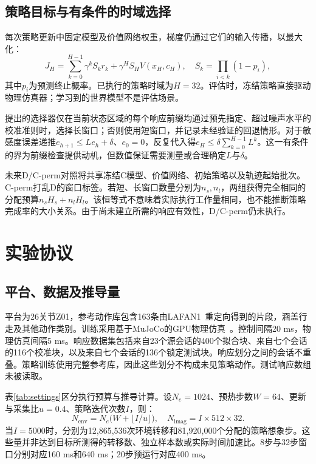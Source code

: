\subsection{策略目标与有条件的时域选择}
每次策略更新中固定模型及价值网络权重，梯度仍通过它们的输入传播，以最大化：
\begin{equation}
J_H=\sum_{k=0}^{H-1}\gamma^k S_k r_k
+\gamma^H S_H V(x_H,c_H),\quad
S_k=\prod_{i<k}(1-p_i),
\label{eq:actor}
\end{equation}
其中$p_i$为预测终止概率。已执行的策略时域为$H=32$。评估时，冻结策略直接驱动物理仿真器；学习到的世界模型不是评估场景。

提出的选择器仅在当前状态区域的每个响应前缀均通过预先指定、超过噪声水平的校准准则时，选择长窗口；否则使用短窗口，并记录未经验证的回退情形。对于敏感度误差递推$e_{h+1}\le Le_h+\delta$、$e_0=0$，反复代入得$e_H\le\delta\sum_{k=0}^{H-1}L^k$。这一有条件的界为前缀检查提供动机，但数值保证需要测量或合理确定$L$与$\delta$。

未来D/C-perm对照将共享冻结C模型、价值网络、初始策略以及轨迹起始批次。C-perm打乱D的窗口标签。若短、长窗口数量分别为$n_s,n_l$，两组获得完全相同的分配预算$n_sH_s+n_lH_l$。该恒等式不意味着实际执行工作量相同，也不能推断策略完成率的大小关系。由于尚未建立所需的响应有效性，D/C-perm仍未执行。

\section{实验协议}
\subsection{平台、数据及推导量}
平台为26关节Z01，参考动作库包含163条由LAFAN1~\cite{lafan}重定向得到的片段，涵盖行走及其他动作类别。训练采用基于MuJoCo的GPU物理仿真~\cite{mujoco}。控制间隔20 ms，物理仿真间隔5 ms。响应数据集包括来自23个源会话的400个拟合块、来自七个会话的116个校准块，以及来自七个会话的136个锁定测试块。响应划分之间的会话不重叠。策略训练使用完整参考库，因此这些划分不构成未见策略动作。测试响应数组未被读取。

表\ref{tab:settings}区分执行预算与推导计算。设$N_e=1024$、预热步数$W=64$、更新与采集比$u=0.4$、策略迭代次数$I$，则：
\begin{equation}
N_{\mathrm{env}}=N_e\bigl(W+\lfloor I/u\rfloor\bigr),\quad
N_{\mathrm{imag}}=I\times512\times32.
\label{eq:budget}
\end{equation}
当$I=5000$时，分别为12,865,536次环境转移和81,920,000个分配的策略想象步。这些量并非达到目标所测得的转移数、独立样本数或实际时间加速比。8步与32步窗口分别对应160 ms和640 ms；20步预运行对应400 ms。

